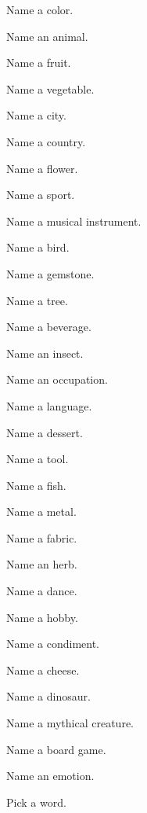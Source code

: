 \item Name a color.
\item Name an animal.
\item Name a fruit.
\item Name a vegetable.
\item Name a city.
\item Name a country.
\item Name a flower.
\item Name a sport.
\item Name a musical instrument.
\item Name a bird.
\item Name a gemstone.
\item Name a tree.
\item Name a beverage.
\item Name an insect.
\item Name an occupation.
\item Name a language.
\item Name a dessert.
\item Name a tool.
\item Name a fish.
\item Name a metal.
\item Name a fabric.
\item Name an herb.
\item Name a dance.
\item Name a hobby.
\item Name a condiment.
\item Name a cheese.
\item Name a dinosaur.
\item Name a mythical creature.
\item Name a board game.
\item Name an emotion.
\item Pick a word.
